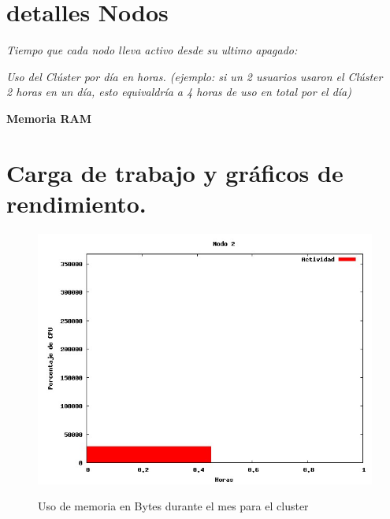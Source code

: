 \documentclass[11pt,a4paper,oneside,openany]{report}
\begin{document}

\newpage
\section{detalles Nodos}
\textit{Tiempo que cada nodo lleva activo desde su ultimo apagado: }

\textit{Uso del Clúster por día en horas. (ejemplo: si un 2 usuarios usaron el Clúster \\
	    2 horas en un día, esto equivaldría a 4 horas de uso en total por el día)}
	  
\textbf{Memoria RAM}
	  

	 



\newpage

\section{Carga de trabajo y gráficos de rendimiento.}



\begin{figure}[htb]
\centering
\includegraphics[width=0.9\linewidth]{memoria1.jpg}\\
\caption{Uso de memoria en Bytes durante el mes para el cluster}
\end{figure}
\end{document}
